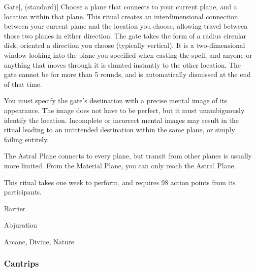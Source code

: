 \lowercase{\hypertarget{spell:Gate}{}}\label{spell:Gate}
\begin{apability}[\nth{7}]{\hypertarget{spell:Gate}{Gate}}[,  (standard)]
Choose a plane that connects to your current plane, and a location within that plane.
This ritual creates an interdimensional connection between your current plane and the location you choose, allowing travel between those two planes in either direction.
The gate takes the form of a \areasmall radius circular disk, oriented a direction you choose (typically vertical).
It is a two-dimensional window looking into the plane you specified when casting the spell, and anyone or anything that moves through it is shunted instantly to the other location.
The gate cannot be  for more than 5 rounds, and is automatically dismissed at the end of that time.

You must specify the gate's destination with a precise mental image of its appearance.
The image does not have to be perfect, but it must unambiguously identify the location.
Incomplete or incorrect mental images may result in the ritual leading to an unintended destination within the same plane, or simply failing entirely.

The Astral Plane connects to every plane, but transit from other planes is usually more limited.
From the Material Plane, you can only reach the Astral Plane.

This ritual takes one week to perform, and requires 98 action points from its participants.
\end{apability}
\vspace{0.25em}


\newpage
\begin{spellsection}{Barrier}

\begin{spellheader}
\end{spellheader}


 Abjuration

 Arcane, Divine, Nature

\subsubsection{Cantrips}


\end{spellsection}


